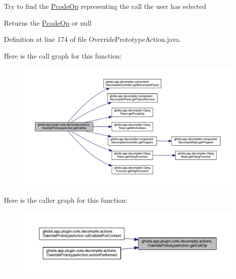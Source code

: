 Try to find the \mbox{\hyperlink{class_pcode_op}{Pcode\+Op}} representing the call the user has selected \begin{DoxyReturn}{Returns}
the \mbox{\hyperlink{class_pcode_op}{Pcode\+Op}} or null 
\end{DoxyReturn}


Definition at line 174 of file Override\+Prototype\+Action.\+java.

Here is the call graph for this function\+:
\nopagebreak
\begin{figure}[H]
\begin{center}
\leavevmode
\includegraphics[width=350pt]{classghidra_1_1app_1_1plugin_1_1core_1_1decompile_1_1actions_1_1_override_prototype_action_aea2f7158a2f70a1c091ae54cd8bc85d7_cgraph}
\end{center}
\end{figure}
Here is the caller graph for this function\+:
\nopagebreak
\begin{figure}[H]
\begin{center}
\leavevmode
\includegraphics[width=350pt]{classghidra_1_1app_1_1plugin_1_1core_1_1decompile_1_1actions_1_1_override_prototype_action_aea2f7158a2f70a1c091ae54cd8bc85d7_icgraph}
\end{center}
\end{figure}
\mbox{\label{classghidra_1_1app_1_1plugin_1_1core_1_1decompile_1_1actions_1_1_override_prototype_action_aa035bd212f83d2cb35253ef232fa18bb}} 

